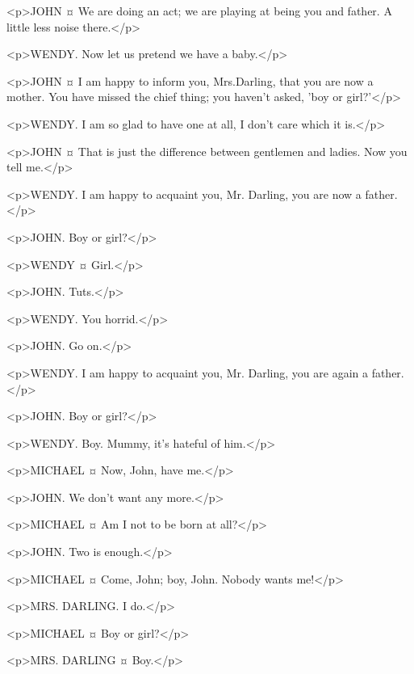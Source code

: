 <p>JOHN ¤
We are doing an act; we are playing at being you and father.
A little less noise there.</p>

<p>WENDY. Now let us pretend we have a baby.</p>

<p>JOHN ¤
I am happy to inform you, Mrs.Darling, that you are now a mother.
You have missed the chief thing; you haven't asked, 'boy or girl?'</p>

<p>WENDY. I am so glad to have one at all, I don't care which it is.</p>

<p>JOHN ¤
That is just the difference between gentlemen and ladies. Now you tell me.</p>

<p>WENDY. I am happy to acquaint you, Mr. Darling, you are now a father.</p>

<p>JOHN. Boy or girl?</p>

<p>WENDY ¤
Girl.</p>

<p>JOHN. Tuts.</p>

<p>WENDY. You horrid.</p>

<p>JOHN. Go on.</p>

<p>WENDY. I am happy to acquaint you, Mr. Darling, you are again a father.</p>

<p>JOHN. Boy or girl?</p>

<p>WENDY. Boy.
Mummy, it's hateful of him.</p>


<p>MICHAEL ¤
Now, John, have me.</p>

<p>JOHN. We don't want any more.</p>

<p>MICHAEL ¤
Am I not to be born at all?</p>

<p>JOHN. Two is enough.</p>

<p>MICHAEL ¤
Come, John; boy, John.
Nobody wants me!</p>

<p>MRS. DARLING. I do.</p>

<p>MICHAEL ¤
Boy or girl?</p>

<p>MRS. DARLING ¤
Boy.</p>


